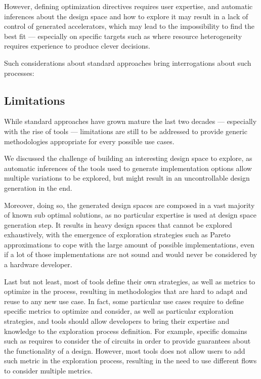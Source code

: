     However, defining optimization directives requires user expertise, and automatic inferences about the design space and how to explore it may result in a lack of control of generated accelerators, which may lead to the impossibility to find the best fit --- especially on specific targets such as  where resource heterogeneity requires experience to produce clever decisions.

   Such considerations about standard  approaches bring interrogations about such processes:


    \subsection{Limitations}
    \label{ch.problem:sec.dse:ssec.limitations}
        While standard  approaches have grown mature the last two decades --- especially with the rise of  tools --- limitations are still to be addressed to provide generic methodologies appropriate for every possible use cases.

        We discussed the challenge of building an interesting design space to explore, as automatic inferences of the tools used to generate implementation options allow multiple variations to be explored, but might result in an uncontrollable design generation in the end.

        Moreover, doing so, the generated design spaces are composed in a vast majority of known sub optimal solutions, as no particular expertise is used at design space generation step.
        It results in heavy design spaces that cannot be explored exhaustively, with the emergence of exploration strategies such as Pareto approximations to cope with the large amount of possible implementations, even if a lot of those implementations are not sound and would never be considered by a hardware developer.

        Last but not least, most of  tools define their own strategies, as well as metrics to optimize in the process, resulting in methodologies that are hard to adapt and reuse to any new use case.
        In fact, some particular use cases require to define specific metrics to optimize and consider, as well as particular exploration strategies, and tools should allow developers to bring their expertise and knowledge to the exploration process definition.
        For example, specific domains such as  requires to consider the  of circuits in order to provide guarantees about the functionality of a design.
        However, most  tools does not allow users to add such metric in the exploration process, resulting in the need to use different flows to consider multiple metrics.

